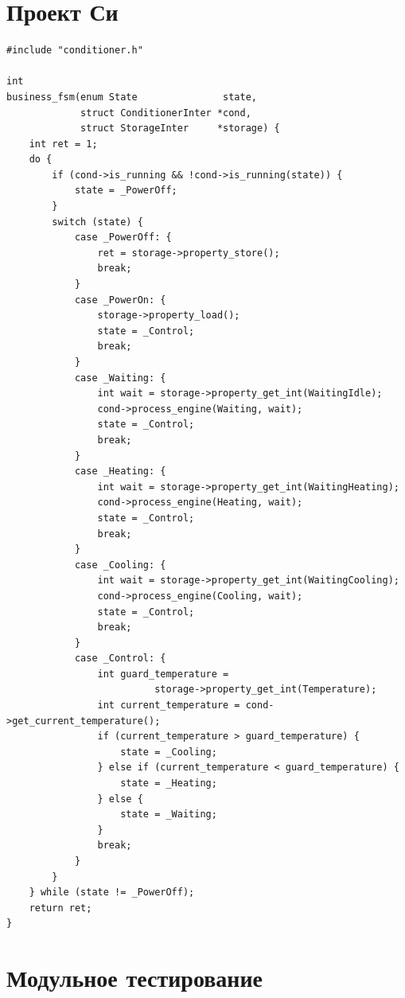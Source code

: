 \documentclass[12pt, twoside]{report}
\begin{document}
\newpage
\section*{Проект Си}\label{practical_work_3}

\begin{lstlisting}[label={main_c_fsm}, caption={Пример управления состояниями на \texttt{C}}]
#include "conditioner.h"

int
business_fsm(enum State               state, 
             struct ConditionerInter *cond, 
             struct StorageInter     *storage) {
    int ret = 1;
    do {
        if (cond->is_running && !cond->is_running(state)) {
            state = _PowerOff;
        }
        switch (state) {
            case _PowerOff: {
                ret = storage->property_store();
                break;
            }
            case _PowerOn: {
                storage->property_load();
                state = _Control;
                break;
            }
            case _Waiting: {
                int wait = storage->property_get_int(WaitingIdle);
                cond->process_engine(Waiting, wait);
                state = _Control;
                break;
            }
            case _Heating: {
                int wait = storage->property_get_int(WaitingHeating);
                cond->process_engine(Heating, wait);
                state = _Control;
                break;
            }
            case _Cooling: {
                int wait = storage->property_get_int(WaitingCooling);
                cond->process_engine(Cooling, wait);
                state = _Control;
                break;
            }
            case _Control: {
                int guard_temperature = 
                          storage->property_get_int(Temperature);
                int current_temperature = cond->get_current_temperature();
                if (current_temperature > guard_temperature) {
                    state = _Cooling;
                } else if (current_temperature < guard_temperature) {
                    state = _Heating;
                } else {
                    state = _Waiting;
                }
                break;
            }
        }
    } while (state != _PowerOff);
    return ret;
}
\end{lstlisting}


\newpage
\section*{Модульное тестирование}\label{practical_work_4}
\end{document}
